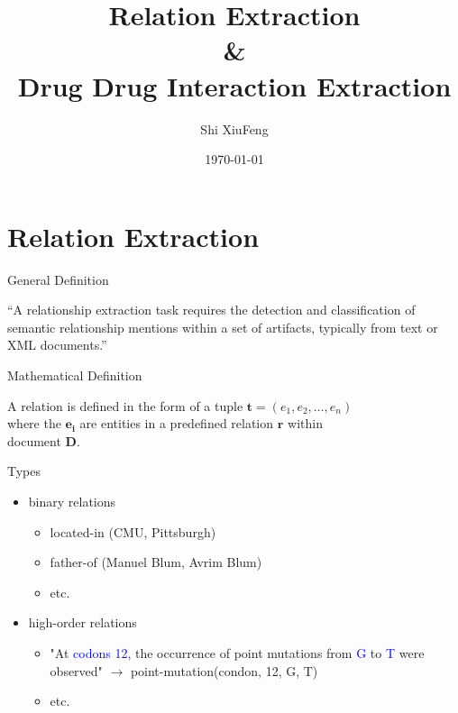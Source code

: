 \documentclass[xcolor={dvipsnames}]{beamer}
\title{Relation Extraction \\ \qquad \& \\ Drug Drug Interaction Extraction}
\date{\today}
\author{\LobsterTwo Shi XiuFeng}
\institute{SCHOOL OF SOFTWARE, DALIAN UNIVERSITY OF TECHNOLOGY}
\begin{document}
\maketitle

\section{Relation Extraction}

\begin{frame}{\insertsection}

\begin{alertblock}{General Definition}

{``A relationship extraction task requires the detection and classification of semantic relationship mentions within a set of artifacts, typically from text or XML documents.''}
  \vskip5mm
  \hspace*{}

\end{alertblock}

\end{frame}

\begin{frame}{\insertsection}

\begin{alertblock}{Mathematical Definition}

		A relation is defined in the form of a tuple $\bm{t} = (e_1, e_2, \dots, e_n)$ \\
		where the $\bm{e_i}$ are entities in a predefined relation $\bm{r}$ within \\ 
		document $\bm{D}$.

\end{alertblock}

\end{frame}

\begin{frame}{\insertsection}

	\begin{exampleblock}{Types}
		\begin{itemize}
			\item binary relations
			\begin{itemize}
				\item located-in (CMU, Pittsburgh)
				\item father-of (Manuel Blum, Avrim Blum)
				\item etc.
			\end{itemize}
			\item high-order relations
			\begin{itemize}
				\item "At \textcolor{blue}{codons 12}, the occurrence of point mutations from \textcolor{blue}{G} to \textcolor{blue}{T} were observed" $\to$ point-mutation(condon, 12, G, T)
				\item etc.
			\end{itemize}
		\end{itemize}
	\end{exampleblock}
\end{frame}
\end{document}
